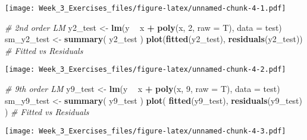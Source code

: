 \documentclass[]{article}
\newenvironment{Shaded}{\begin{snugshade}}{\end{snugshade}}
\newcommand{\CommentTok}[1]{\textcolor[rgb]{0.56,0.35,0.01}{\textit{#1}}}
\newcommand{\DataTypeTok}[1]{\textcolor[rgb]{0.13,0.29,0.53}{#1}}
\newcommand{\DecValTok}[1]{\textcolor[rgb]{0.00,0.00,0.81}{#1}}
\newcommand{\KeywordTok}[1]{\textcolor[rgb]{0.13,0.29,0.53}{\textbf{#1}}}
\newcommand{\NormalTok}[1]{#1}
\newcommand{\OperatorTok}[1]{\textcolor[rgb]{0.81,0.36,0.00}{\textbf{#1}}}
\newcommand{\StringTok}[1]{\textcolor[rgb]{0.31,0.60,0.02}{#1}}
\begin{document}
\texttt{[image: Week\_3\_Exercises\_files/figure-latex/unnamed-chunk-4-1.pdf]}

\begin{Shaded}
\begin{Highlighting}[]
\CommentTok{# 2nd order LM}
\NormalTok{y2_test <-}\StringTok{ }\KeywordTok{lm}\NormalTok{(y }\OperatorTok{~}\StringTok{ }\NormalTok{x }\OperatorTok{+}\StringTok{ }\KeywordTok{poly}\NormalTok{(x, }\DecValTok{2}\NormalTok{, }\DataTypeTok{raw =}\NormalTok{ T), }\DataTypeTok{data =}\NormalTok{ test)}
\NormalTok{sm_y2_test <-}\StringTok{ }\KeywordTok{summary}\NormalTok{( y2_test )}
\KeywordTok{plot}\NormalTok{(}\KeywordTok{fitted}\NormalTok{(y2_test), }\KeywordTok{residuals}\NormalTok{(y2_test)) }\CommentTok{# Fitted vs Residuals}
\end{Highlighting}
\end{Shaded}

\texttt{[image: Week\_3\_Exercises\_files/figure-latex/unnamed-chunk-4-2.pdf]}

\begin{Shaded}
\begin{Highlighting}[]
\CommentTok{# 9th order LM}
\NormalTok{y9_test <-}\StringTok{ }\KeywordTok{lm}\NormalTok{(y }\OperatorTok{~}\StringTok{ }\NormalTok{x }\OperatorTok{+}\StringTok{ }\KeywordTok{poly}\NormalTok{(x, }\DecValTok{9}\NormalTok{, }\DataTypeTok{raw =}\NormalTok{ T), }\DataTypeTok{data =}\NormalTok{ test)}
\NormalTok{sm_y9_test <-}\StringTok{ }\KeywordTok{summary}\NormalTok{( y9_test )}
\KeywordTok{plot}\NormalTok{( }\KeywordTok{fitted}\NormalTok{(y9_test), }\KeywordTok{residuals}\NormalTok{(y9_test) ) }\CommentTok{# Fitted vs Residuals}
\end{Highlighting}
\end{Shaded}

\texttt{[image: Week\_3\_Exercises\_files/figure-latex/unnamed-chunk-4-3.pdf]}
\end{document}
